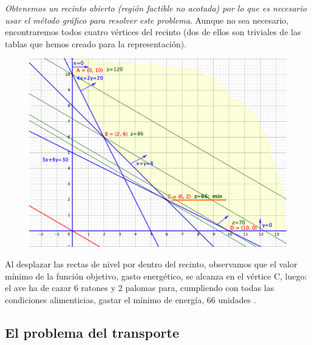 \emph{Obtenemos un recinto abierto (región factible no acotada) por lo que es necesario usar el método gráfico para resolver este problema}. Aunque no sea necesario, encontraremos todos cuatro vértices del recinto (dos de ellos son triviales de las tablas que hemos creado para la representación).


\begin{figure}[H]
	\centering
	\includegraphics[width=.95\textwidth]{imagenes/img24.png}
\end{figure}

\vspace{5mm}
\begin{destacado}
Al desplazar las rectas de nivel por dentro del recinto, observamos que el valor mínimo de la función objetivo, gasto energético, se alcanza en el vértice C, luego: el ave ha de cazar 6 ratones y 2 palomas para, cumpliendo con todas las condiciones alimenticias, gastar el mínimo de energía, 66 unidades	.
\end{destacado}




\vspace{10mm}	
	\subsection{El problema del transporte}\label{transporte}
	\vspace{10mm}
	
